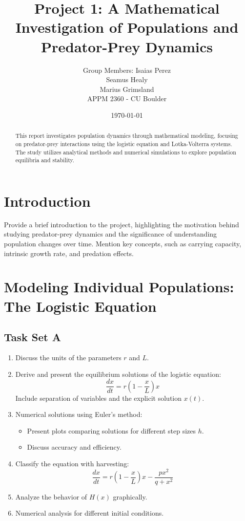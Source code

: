 \documentclass[12pt]{article}
\title{Project 1: A Mathematical Investigation of Populations and Predator-Prey Dynamics}
\author{Group Members: Isaias Perez \\
Seamus Healy\\
Marius Grimsland \\ APPM 2360 - CU Boulder}
\date{\today}
\begin{document}
\maketitle

\begin{abstract}
This report investigates population dynamics through mathematical modeling, focusing on predator-prey interactions using the logistic equation and Lotka-Volterra systems. The study utilizes analytical methods and numerical simulations to explore population equilibria and stability.
\end{abstract}

\section{Introduction}
Provide a brief introduction to the project, highlighting the motivation behind studying predator-prey dynamics and the significance of understanding population changes over time. Mention key concepts, such as carrying capacity, intrinsic growth rate, and predation effects.

\section{Modeling Individual Populations: The Logistic Equation}
\subsection{Task Set A}
\begin{enumerate}
    \item Discuss the units of the parameters $r$ and $L$.
    \item Derive and present the equilibrium solutions of the logistic equation:
    \begin{equation}
        \frac{dx}{dt} = r\left(1 - \frac{x}{L}\right)x
    \end{equation}
    Include separation of variables and the explicit solution $x(t)$.
    \item Numerical solutions using Euler's method:
    \begin{itemize}
        \item Present plots comparing solutions for different step sizes $h$.
        \item Discuss accuracy and efficiency.
    \end{itemize}
    \item Classify the equation with harvesting:
    \begin{equation}
        \frac{dx}{dt} = r\left(1 - \frac{x}{L}\right)x - \frac{px^2}{q + x^2}
    \end{equation}
    \item Analyze the behavior of $H(x)$ graphically.
    \item Numerical analysis for different initial conditions.
\end{enumerate}
\end{document}
